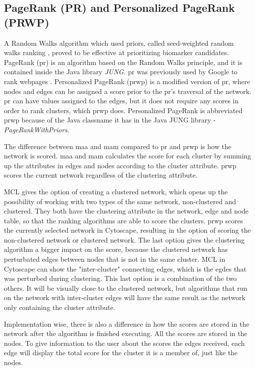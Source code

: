 \subsection{PageRank (PR) and Personalized PageRank (PRWP)}
A Random Walks\cite{random-walks2} algorithm which used priors, called
seed-weighted random walks ranking \cite{sw-rwr}, proved to be effective at
prioritizing biomarker candidates. PageRank (\gls{pr}) is an algorithm based on the
Random Walks principle, and it is contained inside the Java library
\textit{JUNG}\cite{jung}.  \gls{pr} was previously used by Google to rank webpages
\cite{pagerank}.  Personalized PageRank (\gls{prwp})\cite{pr-bio} is a modified
version of \gls{pr}, where nodes and edges can be assigned a score prior to the \gls{pr}'s
traversal of the network. \gls{pr} can have values assigned to the edges, but it does
not require any scores in order to rank clusters, which \gls{prwp} does. Personalized
PageRank is abbreviated \gls{prwp} because of the Java classname it has in the Java
JUNG library
- \textit{PageRankWithPriors}.

The difference between \gls{maa} and \gls{mam} compared to \gls{pr} and \gls{prwp} is how the network is
scored. \gls{maa} and \gls{mam} calculates the score for each cluster by summing up the
attributes in edges and nodes according to the cluster attribute. \gls{prwp} scores
the current network regardless of the clustering attribute. 

MCL gives the option of creating a clustered network, which opens up the
possibility of working with two types of the same network, non-clustered and
clustered. They both have the clustering attribute in the network, edge and node
table, so that the ranking algorithms are able to score the clusters.  \gls{prwp}
scores the currently selected network in Cytoscape, resulting in the option of
scoring the non-clustered network or clustered network. The last option gives
the clustering algorithm a bigger impact on the score, because the clustered
network has perturbated edges between nodes that is not in the same cluster. MCL
in Cytoscape can show the "inter-cluster" connecting edges, which is the egdes
that was perturbed during clustering. This last option is a combination of the
two others. It will be visually close to the clustered network, but algorithms
that run on the network with inter-cluster edges will have the same result as
the network only containing the cluster attribute.

Implementation wise, there is also a difference in how the scores are stored in
the network after the algorithm is finished executing. All the scores are stored
in the nodes. To give information to the user about the scores the edges
received, each edge will display the total score for the cluster it is a member
of, just like the nodes.

